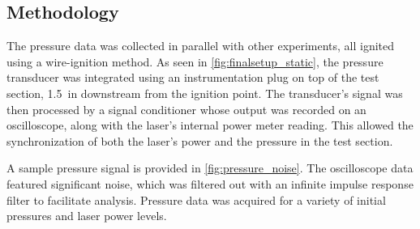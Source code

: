         \subsection{Methodology}
            The pressure data was collected in parallel with other experiments, all ignited using a wire-ignition method. As seen in \autoref{fig:finalsetup_static}, the pressure transducer was integrated using an instrumentation plug on top of the test section, \qty{1.5}{in} downstream from the ignition point. The transducer's signal was then processed by a signal conditioner whose output was recorded on an oscilloscope, along with the laser's internal power meter reading. This allowed the synchronization of both the laser's power and the pressure in the test section.

            A sample pressure signal is provided in \autoref{fig:pressure_noise}. The oscilloscope data featured significant noise, which was filtered out with an infinite impulse response filter to facilitate analysis. Pressure data was acquired for a variety of initial pressures and laser power levels.


